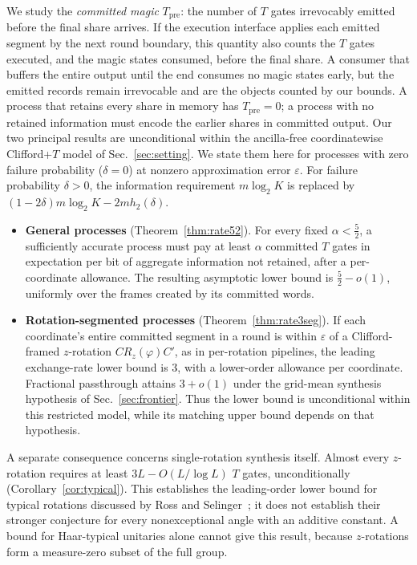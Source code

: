 \documentclass[aps,prx,twocolumn,superscriptaddress,nofootinbib,longbibliography]{revtex4-2}
\theoremstyle{plain}
\theoremstyle{definition}
\theoremstyle{remark}
\newcommand{\Tpre}{T_{\mathrm{pre}}}
\begin{document}
We study the \emph{committed magic} $\Tpre$: the number of $T$ gates irrevocably emitted before the final share arrives. If the execution interface applies each emitted segment by the next round boundary, this quantity also counts the $T$ gates executed, and the magic states consumed, before the final share. A consumer that buffers the entire output until the end consumes no magic states early, but the emitted records remain irrevocable and are the objects counted by our bounds. A process that retains every share in memory has $\Tpre=0$; a process with no retained information must encode the earlier shares in committed output. Our two principal results are unconditional within the ancilla-free coordinatewise Clifford+$T$ model of Sec.~\ref{sec:setting}. We state them here for processes with zero failure probability ($\delta=0$) at nonzero approximation error $\varepsilon$. For failure probability $\delta>0$, the information requirement $m\log_2K$ is replaced by $(1-2\delta)m\log_2K-2mh_2(\delta)$.
\begin{itemize}\setlength\itemsep{1pt}
\item \textbf{General processes} (Theorem~\ref{thm:rate52}). For every fixed $\alpha<\tfrac52$, a sufficiently accurate process must pay at least $\alpha$ committed $T$ gates in expectation per bit of aggregate information not retained, after a per-coordinate allowance. The resulting asymptotic lower bound is $\tfrac52-o(1)$, uniformly over the frames created by its committed words.
\item \textbf{Rotation-segmented processes} (Theorem~\ref{thm:rate3seg}). If each coordinate's entire committed segment in a round is within $\varepsilon$ of a Clifford-framed $z$-rotation $CR_z(\varphi)C'$, as in per-rotation pipelines, the leading exchange-rate lower bound is $3$, with a lower-order allowance per coordinate. Fractional passthrough attains $3+o(1)$ under the grid-mean synthesis hypothesis of Sec.~\ref{sec:frontier}. Thus the lower bound is unconditional within this restricted model, while its matching upper bound depends on that hypothesis.
\end{itemize}
A separate consequence concerns single-rotation synthesis itself. Almost every $z$-rotation requires at least $3L-O(L/\log L)$ $T$ gates, unconditionally (Corollary~\ref{cor:typical}). This establishes the leading-order lower bound for typical rotations discussed by Ross and Selinger~\cite[Sec.~8.3]{RossSelinger}; it does not establish their stronger conjecture for every nonexceptional angle with an additive constant. A bound for Haar-typical unitaries alone cannot give this result, because $z$-rotations form a measure-zero subset of the full group.
\end{document}
